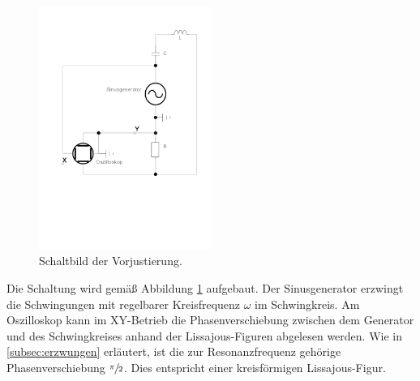 \begin{figure}
    \centering
    \includegraphics[width=0.5\textwidth]{plots/gekop_schw_kreis2.pdf}
    \caption{Schaltbild der Vorjustierung.}
    \label{fig:vorbereitung}
\end{figure}
Die Schaltung wird gemäß Abbildung \ref{fig:vorbereitung} aufgebaut. 
Der Sinusgenerator erzwingt die Schwingungen mit regelbarer Kreisfrequenz $\omega$ im Schwingkreis. 
Am Oszilloskop kann im XY-Betrieb die Phasenverschiebung zwischen dem Generator und des Schwingkreises anhand 
der Lissajous-Figuren abgelesen werden. 
Wie in \ref{subsec:erzwungen} erläutert, ist die zur Resonanzfrequenz gehörige Phasenverschiebung $\sfrac{\pi}{2}$.
Dies entspricht einer kreisförmigen Lissajous-Figur. 

